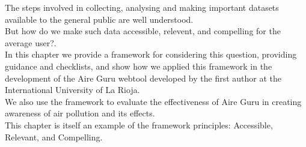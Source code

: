 The steps involved in collecting, analysing and making important datasets available to the general public are well understood. \\

But how do we make such data accessible, relevent, and compelling for the average user?. \\

In this chapter we provide a framework for considering this question, providing guidance and checklists,
and show how we applied this framework in the development of the Aire Guru webtool developed by the first
author at the International University of La Rioja. \\

We also use the framework to evaluate the effectiveness of Aire Guru in creating awareness of air pollution and its effects. \\

This chapter is itself an example of the framework principles: Accessible, Relevant, and Compelling. \\